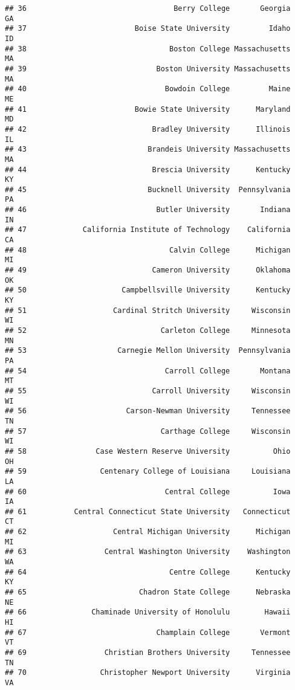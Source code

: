 \documentclass[
]{article}
\begin{document}
\begin{verbatim}
## 36                                  Berry College       Georgia         GA
## 37                         Boise State University         Idaho         ID
## 38                                 Boston College Massachusetts         MA
## 39                              Boston University Massachusetts         MA
## 40                                Bowdoin College         Maine         ME
## 41                         Bowie State University      Maryland         MD
## 42                             Bradley University      Illinois         IL
## 43                            Brandeis University Massachusetts         MA
## 44                             Brescia University      Kentucky         KY
## 45                            Bucknell University  Pennsylvania         PA
## 46                              Butler University       Indiana         IN
## 47             California Institute of Technology    California         CA
## 48                                 Calvin College      Michigan         MI
## 49                             Cameron University      Oklahoma         OK
## 50                      Campbellsville University      Kentucky         KY
## 51                    Cardinal Stritch University     Wisconsin         WI
## 52                               Carleton College     Minnesota         MN
## 53                     Carnegie Mellon University  Pennsylvania         PA
## 54                                Carroll College       Montana         MT
## 55                             Carroll University     Wisconsin         WI
## 56                       Carson-Newman University     Tennessee         TN
## 57                               Carthage College     Wisconsin         WI
## 58                Case Western Reserve University          Ohio         OH
## 59                 Centenary College of Louisiana     Louisiana         LA
## 60                                Central College          Iowa         IA
## 61           Central Connecticut State University   Connecticut         CT
## 62                    Central Michigan University      Michigan         MI
## 63                  Central Washington University    Washington         WA
## 64                                 Centre College      Kentucky         KY
## 65                          Chadron State College      Nebraska         NE
## 66               Chaminade University of Honolulu        Hawaii         HI
## 67                              Champlain College       Vermont         VT
## 69                  Christian Brothers University     Tennessee         TN
## 70                 Christopher Newport University      Virginia         VA

\end{verbatim}
\end{document}
